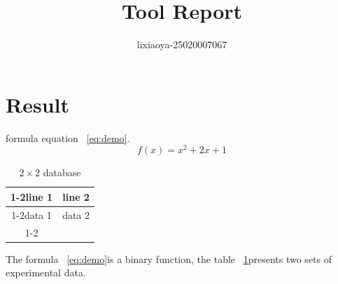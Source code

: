 \documentclass{article}
\begin{document}
\title{Tool Report}
\author{lixiaoya-25020007067}
\maketitle
\section{Result}
formula equation ~\eqref{eq:demo}.
\begin{equation}
f(x)=x^2+2x+1
\label{eq:demo}
\end{equation}
\begin{table}[ht]
\centering
\caption{$2\times2$ database}
\label{tab:twotwo}
\begin{tabular}{|c|c|}
\cline{1-2}line 1 & line 2 \\
\cline{1-2}data 1 & data 2 \\
\cline{1-2}
\end{tabular}
\end{table}
The formula ~\eqref{eq:demo}is a binary function,
the table ~\ref{tab:twotwo}presents two sets of experimental data.
\end{document}
